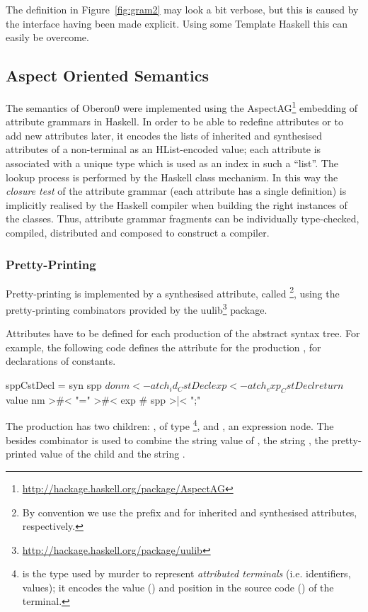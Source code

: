 The definition in Figure~\ref{fig:gram2} may look a bit verbose, but this is caused by the interface having been made explicit. 
Using some Template Haskell this can  easily be overcome.


\subsection{Aspect Oriented Semantics}
The semantics of Oberon0 were implemented using the
AspectAG\footnote{\url{http://hackage.haskell.org/package/AspectAG}}
\cite{Viera:Attribute-Grammars} embedding of attribute grammars in Haskell.  
In order to be able to redefine attributes or to add new attributes later, 
it encodes the lists of inherited and synthesised attributes of a
non-terminal as an HList-encoded \cite{KLS04} value; each attribute is associated with a unique type which is used as an index in such a ``list''. The lookup process is performed by the Haskell class mechanism.  
In this way the \emph{closure test} of the attribute grammar
(each attribute has a single definition) is implicitly realised by the Haskell compiler when building the right instances of the classes.
Thus, attribute grammar fragments can be individually
type-checked, compiled, distributed and composed to construct a
compiler.  

\subsubsection{Pretty-Printing}

Pretty-printing is implemented by a synthesised attribute, 
called \footnote{By convention we use the prefix  and  for inherited and synthesised attributes, respectively.}, 
using the pretty-printing combinators provided by the uulib\footnote{\url{http://hackage.haskell.org/package/uulib}} package.

Attributes have to be defined for each production of the abstract syntax tree. 
For example, the following code defines the attribute  for the production , for declarations of constants.
%
\begin{haskell}
sppCstDecl = syn spp $ do 
               nm  <- at ch_id_CstDecl
               exp <- at ch_exp_CstDecl
               return $ value nm >#< "=" >#< exp # spp >|< ";"
\end{haskell}
%
The production has two children: , of type \footnote{ is the type used by murder to represent \emph{attributed terminals} (i.e. identifiers, values); it encodes the value () and position in the source code () of the terminal.},
and , an expression node.
The besides combinator \texthaskell{(>#<)} is used to combine the string value of , the string ,
the pretty-printed value of the child  and the string .

